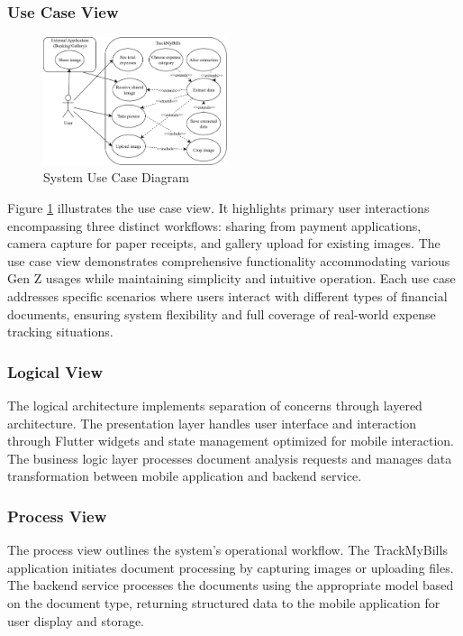 \subsubsection{Use Case View}
\begin{figure}[htbp]
    \centering
    \includegraphics[width=0.48\textwidth]{images/use-case-eng.png}
    \caption{System Use Case Diagram}
    \label{fig:usecase}
\end{figure}

Figure \ref{fig:usecase} illustrates the use case view. It highlights primary user interactions encompassing three distinct workflows: sharing from payment applications, camera capture for paper receipts, and gallery upload for existing images. The use case view demonstrates comprehensive functionality accommodating various Gen Z usages while maintaining simplicity and intuitive operation. Each use case addresses specific scenarios where users interact with different types of financial documents, ensuring system flexibility and full coverage of real-world expense tracking situations.

\subsubsection{Logical View}
The logical architecture implements separation of concerns through layered architecture. The presentation layer handles user interface and interaction through Flutter widgets and state management optimized for mobile interaction. The business logic layer processes document analysis requests and manages data transformation between mobile application and backend service.

\subsubsection{Process View}
The process view outlines the system's operational workflow. The TrackMyBills application initiates document processing by capturing images or uploading files. The backend service processes the documents using the appropriate model based on the document type, returning structured data to the mobile application for user display and storage.

